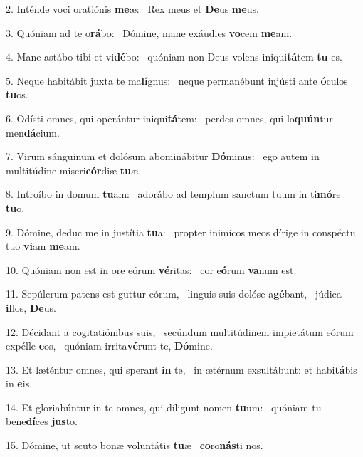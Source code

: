 2. Inténde voci oratiónis \textbf{me}æ: \ast\  Rex meus et \textbf{De}us \textbf{me}us.\

3. Quóniam ad te o\textbf{rá}bo: \ast\  Dómine, mane exáudies \textbf{vo}cem \textbf{me}am.\

4. Mane astábo tibi et vi\textbf{dé}bo: \ast\  quóniam non Deus volens iniqui\textbf{tá}tem \textbf{tu} es.\

5. Neque habitábit juxta te ma\textbf{lí}gnus: \ast\  neque permanébunt injústi ante \textbf{ó}culos \textbf{tu}os.\

6. Odísti omnes, qui operántur iniqui\textbf{tá}tem: \ast\  perdes omnes, qui lo\textbf{quún}tur men\textbf{dá}cium.\

7. Virum sánguinum et dolósum abominábitur \textbf{Dó}minus: \ast\  ego autem in multitúdine miseri\textbf{cór}diæ \textbf{tu}æ.\

8. Introíbo in domum \textbf{tu}am: \ast\  adorábo ad templum sanctum tuum in ti\textbf{mó}re \textbf{tu}o.\

9. Dómine, deduc me in justítia \textbf{tu}a: \ast\  propter inimícos meos dírige in conspéctu tuo \textbf{vi}am \textbf{me}am.\

10. Quóniam non est in ore eórum \textbf{vé}ritas: \ast\  cor e\textbf{ó}rum \textbf{va}num est.\

11. Sepúlcrum patens est guttur eórum, \dag\  linguis suis dolóse a\textbf{gé}bant, \ast\  júdica \textbf{il}los, \textbf{De}us.\

12. Décidant a cogitatiónibus suis, \dag\  secúndum multitúdinem impietátum eórum expélle \textbf{e}os, \ast\  quóniam irrita\textbf{vé}runt te, \textbf{Dó}mine.\

13. Et læténtur omnes, qui sperant \textbf{in} te, \ast\  in ætérnum exsultábunt: et habi\textbf{tá}bis in \textbf{e}is.\

14. Et gloriabúntur in te omnes, qui díligunt nomen \textbf{tu}um: \ast\  quóniam tu bene\textbf{dí}ces \textbf{jus}to.\

15. Dómine, ut scuto bonæ voluntátis \textbf{tu}æ \ast\  \textbf{co}ro\textbf{nás}ti nos.\

